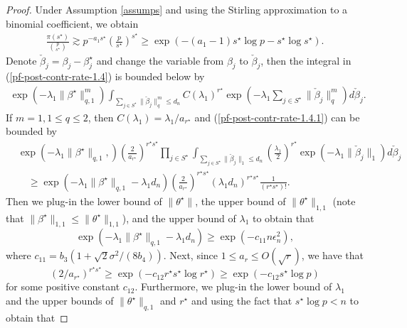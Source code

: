 \documentclass[pdftex, noinfoline, letter]{imsart}
\theoremstyle{plain}
\begin{document}
\begin{proof}
Under Assumption \ref{assumps} and using the Stirling approximation to a binomial coefficient, we obtain
\begin{align*}
    \frac{\pi(s^\star)}{{p \choose s^\star}}
    \gtrsim p^{-a_1 s^\star} \left(\frac{p}{s^\star} \right)^{s^\star} 
    \geq \exp \left(-(a_1-1) s^\star \log p - s^\star \log s^\star \right).
\end{align*}
Denote $\check{\beta}_j = \beta_j - \beta^\star_j$ and change the variable from $\beta_j$ to $\check{\beta}_j$,
then the integral in (\ref{pf-post-contr-rate-1.4}) is bounded below by 
\begin{align}
\label{pf-post-contr-rate-1.4.1}
     \exp\left(-\lambda_1 \|\beta^\star\|_{q,1}^m \right)
    \int_{\sum_{j \in S^\star}
    \|\check{\beta}_j \|_q^m \leq d_n}
    C(\lambda_1)^{r^\star}
    \exp
    \left(
        -\lambda_1 \sum_{j \in S^\star} \|\check\beta_j\|_q^m
    \right) d \check\beta_j.
 \end{align}   
 If $m = 1, 1 \leq q \leq 2$, then
 $C(\lambda_1) = \lambda_1/a_{r^\star}$ and
 (\ref{pf-post-contr-rate-1.4.1}) can be bounded by 
 \begin{align}
    & \exp\left(-\lambda_1 \|\beta^\star\|_{q,1}, \right)
    \left(\frac{2}{a_{r^\star}}\right)^{r^\star s^\star} 
    \prod_{j\in S^\star}
    \int_{\sum_{j \in S^\star} 
        \|\check{\beta}_j\|_1 \leq d_n}
    \left(\frac{\lambda_1}{2}\right)^{r^\star} 
    \exp(-\lambda_1 \|\check\beta_j\|_1) d \check\beta_j 
    \nonumber \\
    & \quad \geq 
    \exp\left(
    -\lambda_1 \|\beta^\star\|_{q,1} 
    - \lambda_1 d_n
    \right)
    \left(\frac{2}{a_{r^\star}}\right)^{r^\star s^\star} 
     (\lambda_1 d_n)^{r^\star s^\star} \frac{1}{(r^\star s^\star)!}.
     \label{pf-post-contr-rate-1.5}
\end{align}
Then we plug-in the lower bound of $\|\theta^\star\|$, the upper bound of $\|\theta^\star\|_{1,1}$ (note that $\|\beta^\star\|_{1,1} \leq \|\theta^\star\|_{1,1}$), and the upper bound of $\lambda_1$
to obtain that $$\exp(-\lambda_1 \|\beta^\star\|_{q,1} - \lambda_1 d_n) \geq \exp(-c_{11} n\epsilon_n^2),$$
where $c_{11} = b_3(1+ \sqrt{2}\sigma^2/(8b_4))$. 
Next, since $1 \leq a_r \leq O(\sqrt{r})$, we have that $$(2/a_{r^\star})^{r^\star s^\star} \geq \exp(-c_{12}r^\star s^\star \log r^\star)\geq \exp(-c_{12}s^\star \log p)$$ for some positive constant $c_{12}$.
Furthermore, 
we plug-in the lower bound of $\lambda_1$ and the upper bounds of $\|\theta^\star\|_{q,1}$ and $r^\star$ and using the fact that $s^\star \log p < n$ to obtain that

\end{proof}
\end{document}
